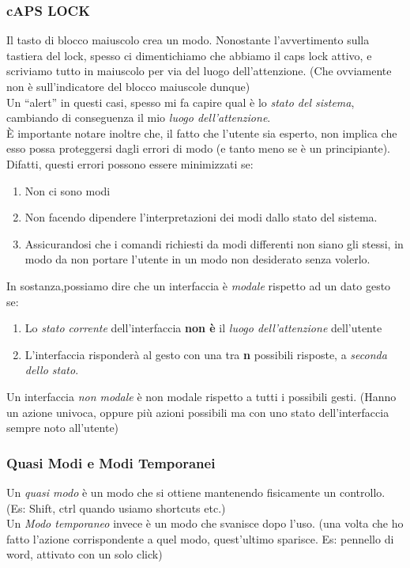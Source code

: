 \documentclass[oneside]{book}
\begin{document}
			\subsubsection{cAPS LOCK}
				Il tasto di blocco maiuscolo crea un modo. Nonostante l'avvertimento sulla tastiera del lock, spesso ci dimentichiamo che abbiamo il caps lock attivo, e scriviamo tutto in maiuscolo per via del luogo dell'attenzione. (Che ovviamente non è sull'indicatore del blocco maiuscole dunque) \\
				Un ``alert'' in questi casi, spesso mi fa capire qual è lo \emph{stato del sistema}, cambiando di conseguenza il mio \emph{luogo dell'attenzione}. \\
				È importante notare inoltre che, il fatto che l'utente sia esperto, non implica che esso possa proteggersi dagli errori di modo (e tanto meno se è un principiante). Difatti, questi errori possono essere minimizzati se:
				\begin{enumerate}
				\item Non ci sono modi
				\item Non facendo dipendere l'interpretazioni dei modi dallo stato del sistema.
				\item Assicurandosi che i comandi richiesti da modi differenti non siano gli stessi, in modo da non portare l'utente in un modo non desiderato senza volerlo.
				\end{enumerate}

			In sostanza,possiamo dire che un interfaccia è \emph{modale} rispetto ad un dato gesto se: 
			\begin{enumerate}
				\item Lo \emph{stato corrente} dell'interfaccia \textbf{non è} il \emph{luogo dell'attenzione} dell'utente
				\item L'interfaccia risponderà al gesto con una tra \textbf{n} possibili risposte, a \emph{seconda dello stato}.
			\end{enumerate}
			Un interfaccia \emph{non modale} è non modale rispetto a tutti i possibili gesti. (Hanno un azione univoca, oppure più azioni possibili ma con uno stato dell'interfaccia sempre noto all'utente)

			\subsubsection{Quasi Modi e Modi Temporanei}
			Un \emph{quasi modo} è un modo che si ottiene mantenendo fisicamente un controllo. (Es: Shift, ctrl quando usiamo shortcuts etc.) \\
			Un \emph{Modo temporaneo} invece è un modo che svanisce dopo l'uso. (una volta che ho fatto l'azione corrispondente a quel modo, quest'ultimo sparisce. Es: pennello di word, attivato con un solo click)
\end{document}
